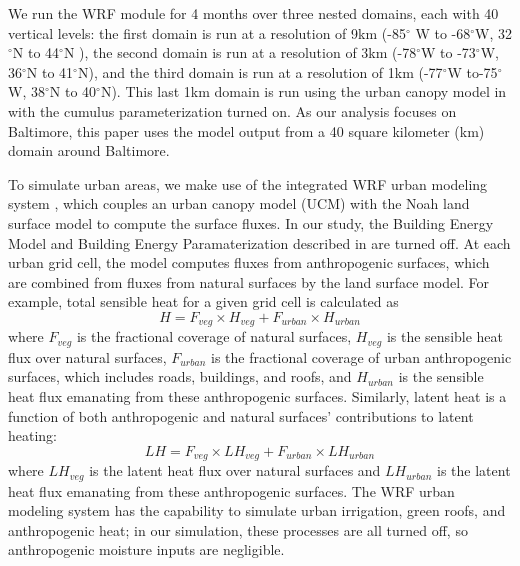 \documentclass[draft,linenumbers]{agujournal}
\begin{document}
We run the WRF module for 4 months over three nested domains, each with 40 vertical levels: the first domain is run at a resolution of 9km (-85$^\circ$ W to -68$^\circ$W, 32$^\circ$N to 44$^\circ$N ), the second domain is run at a resolution of 3km (-78$^\circ$W to -73$^\circ$W, 36$^\circ$N to 41$^\circ$N), and the third domain is run at a resolution of 1km (-77$^\circ$W to-75$^\circ$W, 38$^\circ$N to 40$^\circ$N). This last 1km domain is run using the urban canopy model in \cite{chen2011integrated} with the cumulus parameterization turned on. 
As our analysis focuses on Baltimore, this paper uses the model output from a 40 square kilometer (km) domain around Baltimore.

To simulate urban areas, we make use of the integrated WRF urban modeling system \citep{chen2011integrated}, which couples an urban canopy model (UCM) with the Noah land surface model to compute the surface fluxes. In our study, the Building Energy Model and Building Energy Paramaterization described in \cite{chen2011integrated} are turned off. 
At each urban grid cell, the model computes fluxes from anthropogenic surfaces, which are combined from fluxes from natural surfaces by the land surface model. 
For example, total sensible heat for a given grid cell is calculated as \[ H = F_{veg} \times H_{veg} + F_{urban}\times H_{urban}\]
where $F_{veg}$ is the fractional coverage of natural surfaces, $H_{veg}$ is the sensible heat flux over natural surfaces, $F_{urban}$ is the fractional coverage of urban anthropogenic surfaces, which includes roads, buildings, and roofs, and $H_{urban}$ is the sensible heat flux emanating from these anthropogenic surfaces. Similarly, latent heat is a function of both anthropogenic and natural surfaces' contributions to latent heating: 
\[LH = F_{veg} \times LH_{veg} + F_{urban}\times LH_{urban}\]
where $LH_{veg}$ is the latent heat flux over natural surfaces and $LH_{urban}$ is the latent heat flux emanating from these anthropogenic surfaces.
The WRF urban modeling system has the capability to simulate urban irrigation, green roofs, and anthropogenic heat; in our simulation, these processes are all turned off, so anthropogenic moisture inputs are negligible.
\end{document}

